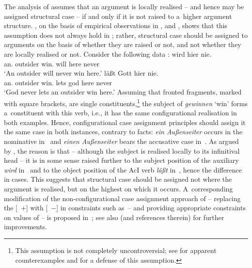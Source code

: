 \documentclass[output=paper
	        ,collection
	        ,collectionchapter
 	        ,biblatex
                ,babelshorthands
                ,newtxmath
                ,draftmode
                ,colorlinks, citecolor=brown
]{langscibook}
\begin{document}
The analysis of \citet{prze:96,Prze99b,Prze99} assumes that an argument is locally realised – and hence may be assigned structural case – if and only if it is not raised to a~higher argument structure.  \citet{Meurers99c,Meurers99b}, on the basis of empirical observations in \citet{Haider90a}, \citet{Grewendorf94a} and \citet{Mueller97c-Eng}, shows that this assumption does not always hold in ; rather, structural case should be assigned to arguments on the basis of whether they are raised or not, and not whether they are locally realised or not.  Consider the following data \citep[294]{Meurers99c}:
\eal
\ex\label{win:ss}
 wird hier nie. \\
    \phtm{[}an.\NOM{} outsider win.\INF{} will here never\\
\glt `An outsider will never win here.'
\ex\label{win:so}
 läßt Gott hier nie. \\
    \phtm{[}an.\ACC{} outsider win.\INF{} lets god here never\\
\glt `God never lets an outsider win here.'
\zl
Assuming that fronted fragments, marked with square brackets, are single constituents,\footnote{This assumption is not completely uncontroversial; see \citet[100–101]{Kiss94} for apparent counterexamples and \citet{Mueller2003b,Mueller2005d,MuellerGS} for a defense of this assumption.} the subject of \emph{gewinnen} `win’ forms a~constituent with this verb, i.e., it has the same configurational realisation in both examples.  Hence, configurational case assignment principles should assign it the same case in both instances, contrary to facts: \emph{ein Au\ss{}enseiter} occurs in the nominative in~ and \emph{einen Au\ss{}enseiter} bears the accusative case in~.  As argued by \citet{Meurers99c,Meurers99b}, the reason is that – although the subject is realised locally to its infinitival head – it is in some sense raised further to the subject position of the auxiliary \emph{wird} in~ and to the object position of the AcI verb \emph{l\"a\ss{}t} in~, hence the difference in cases.  This suggests that structural case should be assigned not where the argument is realised, but on the highest  on which it occurs.  A~corresponding modification of the non-configurational case assignment approach of \citet{prze:96,Prze99b,Prze99} – replacing the [~$+$] with [~$-$] in constraints such as~– and providing appropriate constraints on values of  – is proposed in~\citet[93–95]{Prze99b}; see also \citet[Section~17.4]{MuellerLehrbuch3} (and references therein) for further improvements.
\end{document}
